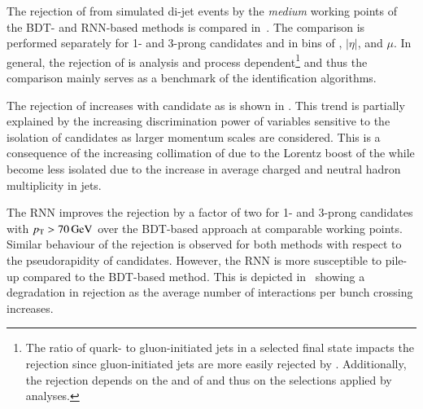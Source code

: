 The rejection of \faketauhadvis from simulated di-jet events by the
\emph{medium} \tauid working points of the BDT- and RNN-based methods
is compared in~. The comparison is
performed separately for 1- and 3-prong \tauhadvis candidates and in
bins of \tauhadvis \pT, \tauhadvis $|\eta|$, and $\mu$. In general,
the \faketauhadvis rejection of \tauid is analysis and process
dependent\footnote{The ratio of quark- to gluon-initiated jets in a
  selected final state impacts the \faketauhadvis rejection since
  gluon-initiated jets are more easily rejected by
  \tauid. Additionally, the rejection depends on the \pT and \Ntracks
  of \faketauhadvis and thus on the selections applied by analyses.}
and thus the comparison mainly serves as a benchmark of the
identification algorithms.

The \faketauhadvis rejection of \tauid increases with \tauhadvis
candidate \pT as is shown in
. This trend is
partially explained by the increasing discrimination power of
variables sensitive to the isolation of \tauhadvis candidates as
larger momentum scales are considered. This is a consequence of the
increasing collimation of \truetauhadvis due to the Lorentz boost of
the \taulepton while \faketauhadvis become less isolated due to the
increase in average charged and neutral hadron multiplicity in jets.


The RNN \tauid improves the \faketauhadvis rejection by a factor of
two for 1- and 3-prong \tauhadvis candidates with
$\pT > \SI{70}{\GeV}$ over the BDT-based approach at comparable
working points. Similar behaviour of the \faketauhadvis rejection is
observed for both methods with respect to the pseudorapidity of
\tauhadvis candidates. However, the RNN \tauid is more susceptible to
pile-up compared to the BDT-based method. This is depicted
in~ showing a
degradation in \faketauhadvis rejection as the average number of
interactions per bunch crossing increases.

